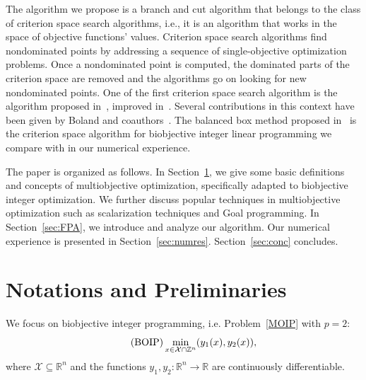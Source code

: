 \documentclass[preprint,12pt]{elsarticle}
\def\R{\mathbb{R}}
\def\Z{\mathbb{Z}}
\begin{document}
The algorithm we propose is a branch and cut algorithm that belongs to the class of criterion space search algorithms, i.e., it is an algorithm that works in the space of
objective functions' values. Criterion space search algorithms find nondominated points by addressing a sequence of single-objective optimization problems.
Once a nondominated point is computed, the dominated parts of the criterion space are removed and the algorithms go on looking for
new nondominated points. One of the first criterion space search algorithm is the algorithm proposed in~\cite{sylva2004method}, improved in~\cite{kirlik2014new, lokman2013finding}.
Several contributions in this context have been given by Boland and coauthors~\cite{boland2015criterion, boland2016shape, boland2017new, 3obj:boland2017quadrant}.
The balanced box method proposed in~\cite{boland2015criterion} is the criterion space algorithm for biobjective integer linear programming we
compare with in our numerical experience.

%
%

The paper is organized as follows. In Section~\ref{sec:notations}, we give some basic definitions and concepts of multiobjective optimization,
specifically adapted to biobjective integer optimization. We further discuss popular techniques
in multiobjective optimization such as scalarization techniques and Goal programming. In Section~\ref{sec:FPA}, we introduce and analyze our algorithm.
Our numerical experience is presented in Section~\ref{sec:numres}.
Section~\ref{sec:conc} concludes.


\section{Notations and Preliminaries}\label{sec:notations}
We focus on biobjective integer programming, i.e. Problem~\eqref{MOIP} with $p=2$:
\begin{equation}\label{BOIP}\tag{\textnormal{BOIP}}
 \min_{x\in \mathcal{X}\cap \Z^n} (y_1(x), y_2(x)),
\end{equation}
where  $\mathcal{X} \subseteq \R^n$  and the functions $y_1,y_2: \R^n\rightarrow \R$ are continuously differentiable.
\end{document}
